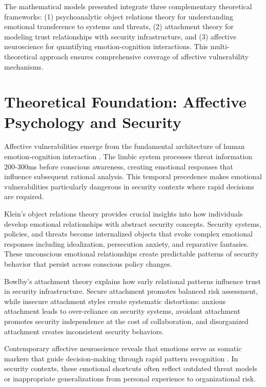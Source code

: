 \documentclass[11pt,a4paper]{article}
\begin{document}
The mathematical models presented integrate three complementary theoretical frameworks: (1) psychoanalytic object relations theory for understanding emotional transference to systems and threats, (2) attachment theory for modeling trust relationships with security infrastructure, and (3) affective neuroscience for quantifying emotion-cognition interactions. This multi-theoretical approach ensures comprehensive coverage of affective vulnerability mechanisms.

\section{Theoretical Foundation: Affective Psychology and Security}

Affective vulnerabilities emerge from the fundamental architecture of human emotion-cognition interaction \cite{ledoux2000}. The limbic system processes threat information 200-300ms before conscious awareness, creating emotional responses that influence subsequent rational analysis. This temporal precedence makes emotional vulnerabilities particularly dangerous in security contexts where rapid decisions are required.

Klein's object relations theory \cite{klein1946} provides crucial insights into how individuals develop emotional relationships with abstract security concepts. Security systems, policies, and threats become internalized objects that evoke complex emotional responses including idealization, persecution anxiety, and reparative fantasies. These unconscious emotional relationships create predictable patterns of security behavior that persist across conscious policy changes.

Bowlby's attachment theory \cite{bowlby1969} explains how early relational patterns influence trust in security infrastructure. Secure attachment promotes balanced risk assessment, while insecure attachment styles create systematic distortions: anxious attachment leads to over-reliance on security systems, avoidant attachment promotes security independence at the cost of collaboration, and disorganized attachment creates inconsistent security behaviors.

Contemporary affective neuroscience reveals that emotions serve as somatic markers that guide decision-making through rapid pattern recognition \cite{damasio1994}. In security contexts, these emotional shortcuts often reflect outdated threat models or inappropriate generalizations from personal experience to organizational risk.
\end{document}
